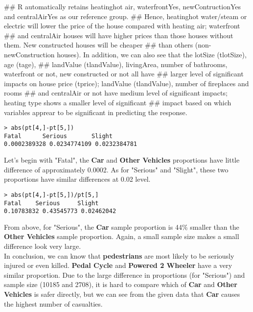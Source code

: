 \documentclass[12pt]{article}
\begin{document}
## R automatically retains heatinghot air, waterfrontYes, newContructionYes and centralAirYes as our reference group.
## Hence, heatinghot water/steam or electric will lower the price of the house compared with heating air; waterfront
## and centralAir houses will have higher prices than those houses without them. New constructed houses will be cheaper
## than others (non-newConstruction houses). In addition, we can also see that the lotSize (tlotSize), age (tage),
## landValue (tlandValue), livingArea, number of bathrooms, waterfront or not, new constructed or not all have
## larger level of significant impacts on house price (tprice); landValue (tlandValue), number of fireplaces and rooms
## and centralAir or not have medium level of significant impacts; heating type shows a smaller level of significant
## impact based on which variables apprear to be significant in predicting the response.
\begin{verbatim}
> abs(pt[4,]-pt[5,])
Fatal      Serious       Slight 
0.0002389328 0.0234774109 0.0232384781 
\end{verbatim}

\bigskip{}
\noindent
Let's begin with "Fatal", the \textbf{Car} and \textbf{Other Vehicles} proportions have little difference of approximately 0.0002. As for "Serious" and "Slight", these two proportions have similar differences at 0.02 level. 

\bigskip{}
\noindent
\begin{verbatim}
> abs(pt[4,]-pt[5,])/pt[5,]
Fatal    Serious     Slight 
0.10783832 0.43545773 0.02462042 
\end{verbatim}

\bigskip{}
\noindent
From above, for "Serious", the \textbf{Car} sample proportion is 44\% smaller than the \textbf{Other Vehicles} sample proportion. Again, a small sample size makes a small difference look very large.\\[10pt]
In conclusion, we can know that \textbf{pedestrians} are most likely to be seriously injured or even killed.  \textbf{Pedal Cycle} and \textbf{Powered 2 Wheeler} have a very similar proportion. Due to the large difference in proportions (for "Serious") and sample size (10185 and 2708), it is hard to compare which of \textbf{Car} and \textbf{Other Vehicles} is safer directly, but we can see from the given data that \textbf{Car} causes the highest number of casualties.  




\end{document}
